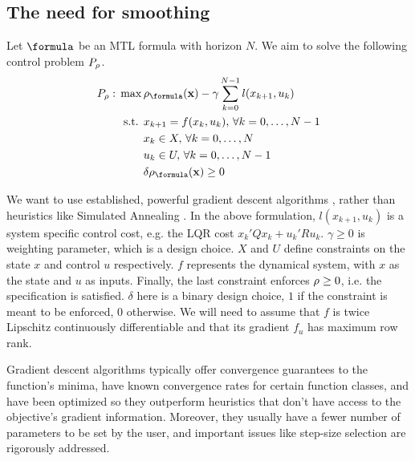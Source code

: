 \subsection{The need for smoothing}
\label{sec:need for smoothing}
Let $\formula$ be an MTL formula with horizon $N$.
We aim to solve the following control problem $P_\rho$.
\begin{subequations}
\label{eq:general_ctrl}
\begin{align}
P_\rob:\, \max\, & \rob_{\formula}(\sstraj) - \gamma \sum_{k=0}^{N-1} l(x_{k+1},u_{k}) \label{eq:general ctrl obj}\\
\text{s.t. } & x_{k+1} = f(x_k,u_k), \, \forall k=0,\dotsc,N-1 \label{eq:general ctrl dyn}\\
 & x_k \in X, \, \forall k=0,\dotsc,N \label{eq:general ctrl X}\\
 & u_k \in U, \, \forall k=0,\dotsc,N-1 \label{eq:general ctrl U}\\
 & \delta \rob_{\formula}(\sstraj) \geq 0 \label{eq:general ctrl pos rob}
\end{align}
\end{subequations}

We want to use established, powerful gradient descent algorithms \cite{Polak97_Optim}, rather than heuristics like Simulated Annealing \cite{kirkpatrickV_SA83}. 
In the above formulation, $l(x_{k+1},u_{k})$ is a system specific control cost, e.g. the LQR cost $x_k'Qx_k + u_k'Ru_k$. $\gamma \geq 0$ is weighting parameter, which is a design choice. $X$ and $U$ define constraints on the state $x$ and control $u$ respectively. $f$ represents the dynamical system, with $x$ as the state and $u$ as inputs. Finally, the last constraint enforces $\rho \geq 0$, i.e. the specification is satisfied. 
$\delta$ here is a binary design choice, $1$ if the constraint is meant to be enforced, $0$ otherwise.
We will need to assume that $f$ is twice Lipschitz continuously differentiable and that its gradient $f_u$ has maximum row rank.

Gradient descent algorithms typically offer convergence guarantees to the function's minima, have known convergence rates for certain function classes, and have been optimized so they outperform heuristics that don't have access to the objective's gradient information.
Moreover, they usually have a fewer number of parameters to be set by the user, and important issues like step-size selection are rigorously addressed.

